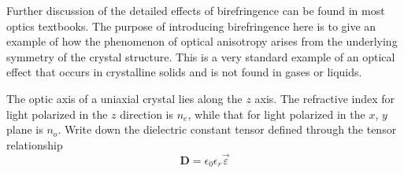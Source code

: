 \documentclass[12pt]{book}
\begin{document}
Further discussion of the detailed effects of birefringence can be found in most optics textbooks. The purpose of introducing birefringence here is to give an example of how the phenomenon of optical anisotropy arises from the underlying symmetry of the crystal structure. This is a very standard example of an optical effect that occurs in crystalline solids and is not found in gases or liquids.
\begin{Exercise}
  The optic axis of a uniaxial crystal lies along the $z$ axis. The refractive index for light polarized in the $z$ direction is $n_e$, while that for light polarized in the $x$, $y$ plane is $n_o$. Write down the dielectric constant tensor defined  through the tensor relationship
  \begin{equation*}
    \mathbf{D}=\epsilon_0\epsilon_r\vec{\varepsilon}
  \end{equation*}
\end{Exercise}
\end{document}
